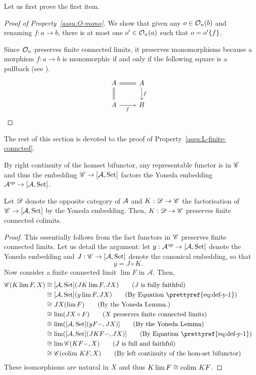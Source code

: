 Let us first prove the first item.
\begin{proof}[Proof of Property~\ref{assu:O-mono}]

We show that given any $o\in\Oop nb$ and renaming $f:a\rightarrow b$,
there is at most one $o'\in\Oop na$ such that $o=\rename{o'}f$. 

Since $\Oby n$ preserves finite connected limits, it preserves monomorphisms
because a morphism $f:a\rightarrow b$ is monomorphic if and only
if the following square is a pullback (see \citet[Exercise III.4.4]{MacLane:cwm}).\[\begin{tikzcd} 	A & A \\ 	A & B 	\arrow["f", from=1-2, to=2-2] 	\arrow[equal, from=1-1, to=1-2] 	\arrow["f"', from=2-1, to=2-2] 	\arrow[Rightarrow, no head, from=1-1, to=2-1] \end{tikzcd}\]
\end{proof}
The rest of this section is devoted to the proof of Property~\ref{assu:L-finite-conncted}.

By right continuity of the homset bifunctor, any representable functor
is in $\C$ and thus the embedding $\C\rightarrow[\mathcal{A},\Set]$
factors the Yoneda embedding $\op{\mathcal{A}}\rightarrow[\mathcal{A},\Set]$.
\begin{lemma}
\label{lem:K-finite-connected}Let $\D$ denote the opposite category
of ${\cal A}$ and $K:\D\rightarrow\C$ the factorisation of $\C\rightarrow[{\cal A},\Set]$
by the Yoneda embedding. Then, $K:\D\rightarrow\C$ preserves finite
connected colimits.
\end{lemma}
\begin{proof}
This essentially follows from the fact functors in $\C$ preserves
finite connected limits. Let us detail the argument: let $y:\op{\mathcal{A}}\rightarrow[\mathcal{A},\Set]$
denote the Yoneda embedding and $J:\C\rightarrow[\mathcal{A},\Set]$
denote the canonical embedding, so that 
\begin{equation}
y=J\circ K.\label{eq:def-y-1}
\end{equation}
Now consider a finite connected limit $\lim F$ in $\mathcal{A}$.
Then, 
\begin{align*}
\C(K\lim F,X) & \cong[{\cal A},\Set](JK\lim F,JX)\tag{\ensuremath{J} is fully faithful}\\
 & \cong[\mathcal{A},\Set](y\lim F,JX)\tag{By Equation \prettyref{eq:def-y-1}}\\
 & \cong JX(\lim F)\tag{By the Yoneda Lemma.}\\
 & \cong\lim(JX\circ F)\tag{\ensuremath{X} preserves finite connected limits}\\
 & \cong\lim([\mathcal{A},\Set](yF-,JX)]\tag{By the Yoneda Lemma}\\
 & \cong\lim([\mathcal{A},\Set](JKF-,JX)]\tag{By Equation \prettyref{eq:def-y-1}}\\
 & \cong\lim\C(KF-,X)\tag{\ensuremath{J} is full and faithful}\\
 & \cong\C(\colim KF,X)\tag{By left continuity of the hom-set bifunctor}
\end{align*}
These isomorphisms are natural in $X$ and thus $K\lim F\cong\colim KF$.
\end{proof}

